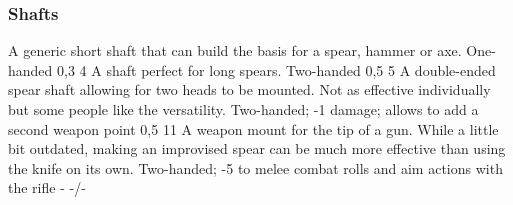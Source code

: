 \subsubsection{Shafts}
\vspace{8mm}
\begin{multicols}{2}
    {A generic short shaft that can build the basis for a spear, hammer or axe.}
    {One-handed}
    {0,3}
    {4}
    {}
    {A shaft perfect for long spears.}
    {Two-handed}
    {0,5}
    {5}
    {}
    {A double-ended spear shaft allowing for two heads to be mounted.
        Not as effective individually but some people like the versatility.}
    {Two-handed; -1 damage; allows to add a second weapon point}
    {0,5}
    {11}
    {}
    {A weapon mount for the tip of a gun.
        While a little bit outdated,
        making an improvised spear can be much more effective than using the knife on its own.}
    {Two-handed; -5 to melee combat rolls and aim actions with the rifle}
    {-}
    {-/-}
    {}
\end{multicols}

